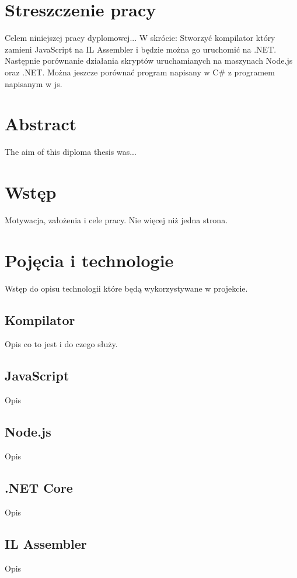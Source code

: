 \documentclass[a4paper]{article}
\begin{document}
\section*{Streszczenie pracy}
%
Celem niniejszej pracy dyplomowej...
W skrócie: Stworzyć kompilator który zamieni JavaScript na IL Assembler i będzie można go uruchomić na .NET. Następnie porównanie działania skryptów uruchamianych na maszynach Node.js oraz .NET. Można jeszcze porównać program napisany w C\# z programem napisanym w js.

\hspace{0pt}
\vfill

\section*{Abstract}
%
The aim of this diploma thesis was...
\vfill
\hspace{0pt}

\newpage
\tableofcontents
\newpage

\section{Wstęp}
Motywacja, założenia i cele pracy.
Nie więcej niż jedna strona.

\section{Pojęcia i technologie}
Wstęp do opisu technologii które będą wykorzystywane w projekcie.
\subsection{Kompilator}
Opis co to jest i do czego służy.
\subsection{JavaScript}
Opis
\subsection{Node.js}
Opis
\subsection{.NET Core}
Opis
\subsection{IL Assembler}
Opis
\end{document}
